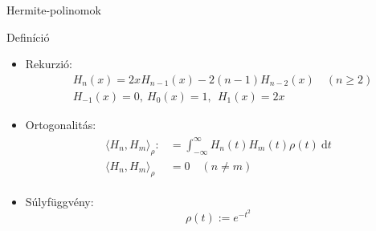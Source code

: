 \documentclass{beamer}
\newcommand{\dt}{\ \mathrm{d}t}
\begin{document}
\begin{frame}{Hermite-polinomok}
\linespread{1.0}
\begin{block}{Definíció}
	\begin{itemize}
		\item Rekurzió:
			\begin{equation*}
				\begin{split}
					&H_n(x)=2xH_{n-1}(x)-2(n-1)H_{n-2}(x)\quad (n\ge 2)\\
					&H_{-1}(x)=0,\  H_0(x)=1,\ \ H_1(x)=2x
				\end{split}
			\end{equation*}
		\item Ortogonalitás:
			\begin{gather*}
				\begin{split}
					\langle H_n,H_m\rangle_{\rho}:&=\int_{-\infty}^\infty H_n(t) H_m(t)\rho(t) \dt\\
					\langle H_n,H_m\rangle_{\rho} &= 0 \quad (n \neq m)
				\end{split}
			\end{gather*}
		\item Súlyfüggvény:
			\begin{equation*}
				\rho(t) := e^{-t^2}
			\end{equation*}
	\end{itemize}
\end{block}
\end{frame}
\end{document}
